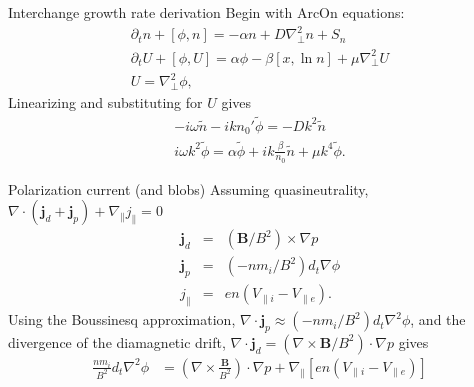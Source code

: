 \documentclass[12pt,table]{beamer}
\begin{document}
\begin{frame}{Interchange growth rate derivation} \scriptsize
Begin with ArcOn equations:
    \begin{align}
    \partial_t n + [\phi, n ] = - \alpha n + D \nabla_\bot ^2 n + S_n \label{eq:arc-n}\\
    \partial_t U + [\phi, U ] =  \alpha \phi - \beta [x, \ln n] + \mu \nabla_\bot ^2 U \label{eq:arc-u}\\
    U = \nabla_\bot ^2 \phi, \label{eq:arc-phi}
\end{align}
Linearizing and substituting for $U$ gives
\begin{align}
-i \omega \tilde{n} - i k n_0' \tilde{\phi}  = - D k^2 \tilde{n} \\
i \omega k^2 \tilde{\phi} = \alpha \tilde{\phi} + i k \frac{\beta}{n_0} \tilde{n} + \mu k^4 \tilde{\phi}.
\end{align}
\end{frame}

\begin{frame}{Polarization current (and blobs)}
    Assuming quasineutrality, $\nabla \cdot (\bm{j}_d + \bm{j}_p) + \nabla_\parallel j_\parallel = 0$
    \begin{eqnarray}
    \bm{j}_d &=& (\bm{B}/B^2) \times \nabla p \\
    \bm{j}_p &=& (-n m_i / B^2)d_t\nabla \phi \\
    j_\parallel &=& en(V_{\parallel i} - V_{\parallel e}).
    \end{eqnarray}
    Using the Boussinesq approximation, $\nabla \cdot \bm{j}_p \approx (-nm_i / B^2) d_t \nabla^2 \phi$, and the divergence of the diamagnetic drift, $\nabla \cdot \bm{j}_d = \left ( \nabla \times \bm{B}/B^2 \right) \cdot \nabla p $ gives
    \begin{align}
    \frac{nm_i }{B^2} d_t \nabla^2 \phi &= \left ( \nabla \times \frac{\bm{B}}{B^2} \right ) \cdot \nabla p + \nabla_\parallel [en(V_{\parallel i} - V_{\parallel e})]
    \end{align}
\end{frame}
\end{document}

